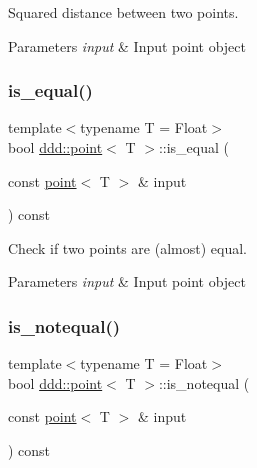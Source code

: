 Squared distance between two points. 


\begin{DoxyParams}{Parameters}
{\em input} & Input point object \\
\hline
\end{DoxyParams}
\mbox{\label{classddd_1_1point_aa4cdbbf16736ee09e840e33f77e94b8a}} 
\subsubsection{\texorpdfstring{is\+\_\+equal()}{is\_equal()}}
{\footnotesize\ttfamily template$<$typename T = Float$>$ \\
bool \hyperlink{classddd_1_1point}{ddd\+::point}$<$ T $>$\+::is\+\_\+equal (\begin{DoxyParamCaption}\item[{const \hyperlink{classddd_1_1point}{point}$<$ T $>$ \&}]{input }\end{DoxyParamCaption}) const\hspace{0.3cm}{\ttfamily [inline]}}



Check if two points are (almost) equal. 


\begin{DoxyParams}{Parameters}
{\em input} & Input point object \\
\hline
\end{DoxyParams}
\mbox{\label{classddd_1_1point_a3d2415605fc07e3e0ed54ad68e2ade92}} 
\subsubsection{\texorpdfstring{is\+\_\+notequal()}{is\_notequal()}}
{\footnotesize\ttfamily template$<$typename T = Float$>$ \\
bool \hyperlink{classddd_1_1point}{ddd\+::point}$<$ T $>$\+::is\+\_\+notequal (\begin{DoxyParamCaption}\item[{const \hyperlink{classddd_1_1point}{point}$<$ T $>$ \&}]{input }\end{DoxyParamCaption}) const\hspace{0.3cm}{\ttfamily [inline]}}



